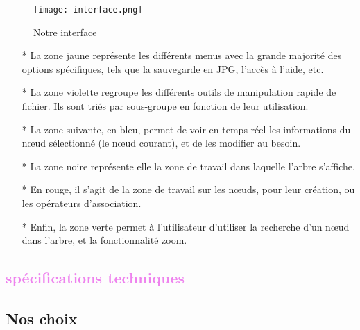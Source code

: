 \documentclass[12pt, a4paper]{article}
\begin{document}
\begin{figure}[h]
\begin{center}
   \texttt{[image: interface.png]}
	\caption{Notre interface}
	\end{center}
\end{figure}

\begin{itemize}
\item [*]La zone jaune représente les différents menus avec la grande majorité des options spécifiques, tels que la sauvegarde en JPG, l'accès à l'aide, etc. 
\item [*]La zone violette regroupe les différents outils de manipulation rapide de fichier. Ils sont triés par sous-groupe en fonction de leur utilisation. 
\item [*]La zone suivante, en bleu, permet de voir en temps réel les informations du nœud sélectionné (le nœud courant), et de les modifier au besoin. 
\item [*]La zone noire représente elle la zone de travail dans laquelle l'arbre s'affiche. 
\item [*]En rouge, il s'agit de la zone de travail sur les nœuds, pour leur création, ou les opérateurs d'association. 
\item [*]Enfin, la zone verte permet à l'utilisateur d'utiliser la recherche d'un nœud dans l'arbre, et la fonctionnalité zoom.
\end{itemize}

\textcolor{Violet}{\section{spécifications techniques}}

\textcolor{NavyBlue}{\subsection{Nos choix}}
\end{document}
